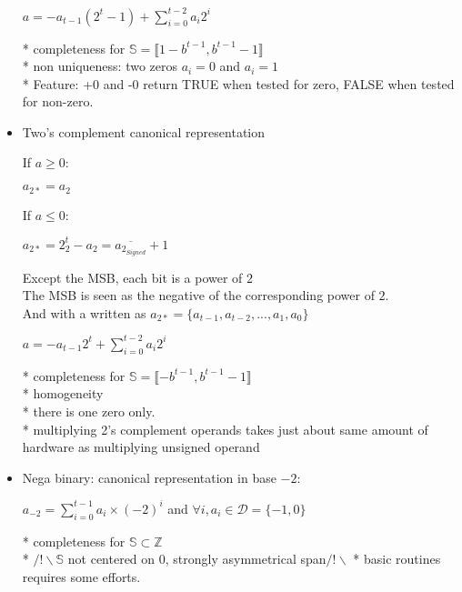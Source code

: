 \begin{itemize}
\begin{center}
\begin{small}
					$ a = - a_{t-1} (2^{t}-1) + \sum \limits_{i=0}^{t-2} a_i 2^{i}$
				\end{small}	
			\end{center}
			* completeness for $\mathbb{S}=\llbracket 1-b^{t-1}, b^{t-1}-1 \rrbracket$ \\
			* non uniqueness: two zeros $a_i=0$ and $a_i=1$\\
			* Feature: +0 and -0 return TRUE when tested for zero, FALSE when tested for non-zero. 

		\item  Two's complement canonical representation
			\begin{center}	
			If $a \geq 0$:
				\begin{small}	
					$ a_{2*} = a_2 $
				\end{small}	
			If $a \leq 0$:				
				\begin{small}	
					$ a_{2*} = 2^{t}_2-a_2 = \overline{ a_{2_{Signed}} }+1 $
				\end{small}					
			\end{center}
			Except the MSB, each bit is a power of $2$\\
			The MSB is seen as the negative of the corresponding power of $2$.\\
			And with a written as $ a_{2*} = \{a_{t-1}, a_{t-2}, ..., a_{1}, a_{0}  \} $ 
			\begin{center}	
				\begin{small}	
					$ a = - a_{t-1} 2^{t} + \sum \limits_{i=0}^{t-2} a_i 2^{i}$
				\end{small}	
			\end{center}
			* completeness for $\mathbb{S}=\llbracket -b^{t-1}, b^{t-1}-1 \rrbracket$ \\
			* homogeneity \\
			* there is one zero only. \\
			* multiplying 2's complement operands takes just about same amount of hardware as multiplying unsigned operand\\

		\item Nega binary: canonical representation in base $-2$: \\ 
		\begin{small}
			\begin{center}	
					$  a_{-2} =  \sum \limits_{i=0}^{t-1} a_i \times (-2)^i$ 
					and $\forall i, a_i \in \mathcal{D}=\{-1, 0\}$ 		
			\end{center}
		\end{small}
			* completeness for $\mathbb{S} \subset  \mathbb{Z} $ \\
			* $/!\backslash \mathbb{S}$ not centered on 0, strongly asymmetrical span$/!\backslash$
			* basic routines requires some efforts.\\


\end{itemize}
